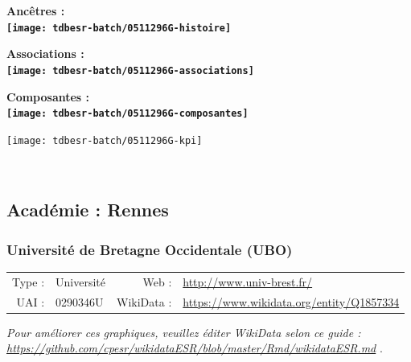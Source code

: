\documentclass[12pt,french,]{article}
\begin{document}
\vspace{1cm}  
\begin{minipage}[b]{0.50\textwidth}\begin{center} \bf Ancêtres : \\  
\texttt{[image: tdbesr-batch/0511296G-histoire]} \end{center}\end{minipage}\begin{minipage}[b]{0.50\textwidth}\begin{center} \bf Associations : \\  
\texttt{[image: tdbesr-batch/0511296G-associations]} \end{center}\end{minipage}

\hrulefill

\begin{center} \bf Composantes : \\  
\texttt{[image: tdbesr-batch/0511296G-composantes]} \end{center}

\begin{center}\texttt{[image: tdbesr-batch/0511296G-kpi]} \end{center}\checkoddpage

\ifoddpage \fi ~\newpage  

\hypertarget{acaduxe9mie-rennes}{%
\subsection{Académie : Rennes}\label{acaduxe9mie-rennes}}

\hypertarget{universituxe9-de-bretagne-occidentale-ubo}{%
\subsubsection{Université de Bretagne Occidentale
(UBO)}\label{universituxe9-de-bretagne-occidentale-ubo}}

\begin{tabular*}{\textwidth}{rp{5cm}rl}  
\hline  
Type : & Université & Web : &\href{http://www.univ-brest.fr/}{http://www.univ-brest.fr/} \\  
UAI : & 0290346U & WikiData : & \href{https://www.wikidata.org/entity/Q1857334}{https://www.wikidata.org/entity/Q1857334} \\  
\hline  
\end{tabular*}

\textit{\scriptsize Pour améliorer ces graphiques, veuillez éditer WikiData selon ce guide :  \href{https://github.com/cpesr/wikidataESR/blob/master/Rmd/wikidataESR.md}{https://github.com/cpesr/wikidataESR/blob/master/Rmd/wikidataESR.md}}
.
\end{document}
